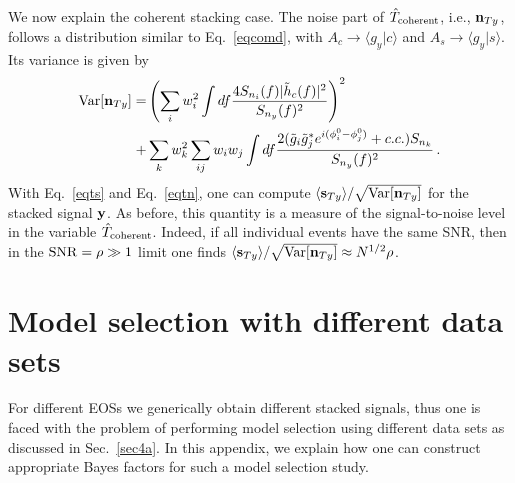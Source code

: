\documentclass[prd,aps,floatfix,superscriptaddress,nofootinbib,twocolumn,10pt,English]{revtex4-1}
\begin{document}
We now explain the coherent stacking case.
The noise part of $\hat{T}_{\rm coherent}$, i.e., ${\bf n}_{Ty}$,
follows a distribution similar to Eq.~\eqref{eqcomd}, with $A_c
\rightarrow \langle g_y |c \rangle$ and $A_s \rightarrow \langle g_y | s
\rangle $. Its variance is given by
\begin{align}\label{eqtn}
{\rm Var}[{\bf n}_{Ty}] 
= &  \left (\sum_i w^2_i \int df \frac{4 S_{n_i}(f) |\tilde h_c(f)|^2}{S_{n_y}(f)^2} \right )^2 \nonumber \\
+&  \sum_k w^2_k \sum_{i j } w_i w_j \int df \frac{2(\tilde g_i \tilde g^*_j e^{i ( \phi^0_i-\phi^0_j)}+c.c.) S_{n_k}}{S_{n_y}(f)^2}\,.
\end{align}
With Eq.~\eqref{eqts} and Eq.~\eqref{eqtn}, one can compute $\langle
{\bf s}_{Ty} \rangle/\sqrt{{\rm Var}[{\bf n}_{Ty}]}$ for the stacked signal
${\bf y}$. As before, this quantity is a measure of the signal-to-noise
level in the variable $\hat{T}_{\rm coherent}$.  Indeed, if all
individual events have the same SNR, then in the ${\rm SNR} = \rho \gg
1$ limit one finds $\langle {\bf s}_{Ty} \rangle/\sqrt{{\rm
    Var}[{\bf n}_{Ty}]} \approx N^{1/2} \rho$.


\section{Model  selection with different data sets}\label{appendixB}

For different EOSs we generically obtain different stacked signals,
thus one is faced with the problem of performing model selection using
different data sets as discussed in Sec.~\ref{sec4a}. In this appendix, we explain
how one can construct appropriate Bayes factors for such a model selection study.
\end{document}
